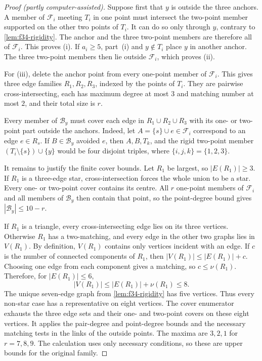 \documentclass[11pt]{article}
\numberwithin{equation}{section}
\theoremstyle{definition}
\theoremstyle{remark}
\newcommand{\F}{\mathcal F}
\newcommand{\B}{\mathcal B}
\begin{document}
\begin{proof}[Proof (partly computer-assisted)]
Suppose first that $y$ is outside the three anchors. A member of $\F_i$
meeting $T_i$ in one point must intersect the two-point member supported on
the other two points of $T_i$. It can do so only through $y$, contrary to
\cref{lem:f34-rigidity}. The anchor and the three two-point members are
therefore all of $\F_i$. This proves (i). If $a_i\ge5$, part~(i) and
$y\notin T_i$ place $y$ in another anchor. The three two-point members then
lie outside $\F_i$, which proves (ii).

For (iii), delete the anchor point from every one-point member of $\F_i$.
This gives three edge families $R_1,R_2,R_3$, indexed by the points of
$T_i$. They are pairwise cross-intersecting, each has maximum degree at most
$3$ and matching number at most $2$, and their total size is $r$.

Every member of $\B_y$ must cover each edge in $R_1\cup R_2\cup R_3$ with
its one- or two-point part outside the anchors. Indeed, let
$A=\{s\}\cup e\in\F_i$ correspond to an edge $e\in R_s$. If
$B\in\B_y$ avoided $e$, then $A,B,T_k$, and the rigid two-point member
$(T_i\setminus\{s\})\cup\{y\}$ would be four disjoint triples, where
$\{i,j,k\}=\{1,2,3\}$.

It remains to justify the finite cover bounds. Let $R_1$ be largest, so
$|E(R_1)|\ge3$. If $R_1$ is a three-edge star, cross-intersection forces the
whole union to be a star. Every one- or two-point cover contains its centre.
All $r$ one-point members of $\F_i$ and all members of $\B_y$ then contain
that point, so the point-degree bound gives $|\B_y|\le10-r$.

If $R_1$ is a triangle, every cross-intersecting edge lies on its three
vertices. Otherwise $R_1$ has a two-matching, and every edge in the other two
graphs lies in $V(R_1)$. By definition, $V(R_1)$ contains only vertices
incident with an edge. If $c$ is the number of connected components of
$R_1$, then $|V(R_1)|\le |E(R_1)|+c$. Choosing one edge from each component
gives a matching, so $c\le\nu(R_1)$. Therefore, for $|E(R_1)|\le6$,
\[
 |V(R_1)|\le |E(R_1)|+\nu(R_1)\le8.
\]
The unique seven-edge graph from \cref{lem:f34-rigidity} has five vertices.
Thus every non-star case has a representative on eight vertices. The cover
enumerator exhausts the three edge sets and their one- and two-point covers on
these eight vertices. It applies the pair-degree and point-degree bounds and
the necessary matching tests in the links of the outside points. The maxima
are $3,2,1$ for $r=7,8,9$. The calculation uses only necessary conditions,
so these are upper bounds for the original family.


\end{proof}
\end{document}
